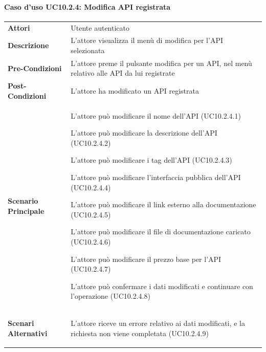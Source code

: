 \paragraph{Caso d'uso UC10.2.4: Modifica API registrata}
\label{UC10_2_4}

\begin{minipage}{\linewidth}
	\begin{tabular}{ l | p{11cm}}
		\hline
		\rowcolor{Gray}
		\multicolumn{2}{c}{UC10.2.4 - Modifica API registrata} \\
		\hline
		\textbf{Attori} & Utente autenticato \\
		\textbf{Descrizione} & L'attore visualizza il menù di modifica per l'API selezionata\\
		\textbf{Pre-Condizioni} & L'attore preme il pulsante modifica per un API, nel menù relativo alle API da lui registrate\\
		\textbf{Post-Condizioni} & L'attore ha modificato un API registrata \\
		\textbf{Scenario Principale} & 
		\begin{enumerate*}[label=(\arabic*.),itemjoin={\newline}]
			\item L'attore può modificare il nome dell'API (UC10.2.4.1)
			\item L'attore può modificare la descrizione dell'API (UC10.2.4.2)
			\item L'attore può modificare i tag dell'API (UC10.2.4.3)
			\item L'attore può modificare l'interfaccia pubblica dell'API (UC10.2.4.4)
			\item L'attore può modificare il link esterno alla documentazione (UC10.2.4.5)
			\item L'attore può modificare il file di documentazione caricato  (UC10.2.4.6)
			\item L'attore può modificare il prezzo base per l'API (UC10.2.4.7)
			\item L'attore può confermare i dati modificati e continuare con l'operazione (UC10.2.4.8)
		\end{enumerate*}\\
		\textbf{Scenari Alternativi} & 
		\begin{enumerate*}[label=(\arabic*.),itemjoin={\newline}]
			\item L'attore riceve un errore relativo ai dati modificati, e la richiesta non viene completata (UC10.2.4.9)
		\end{enumerate*}\\
	\end{tabular}
\end{minipage}

